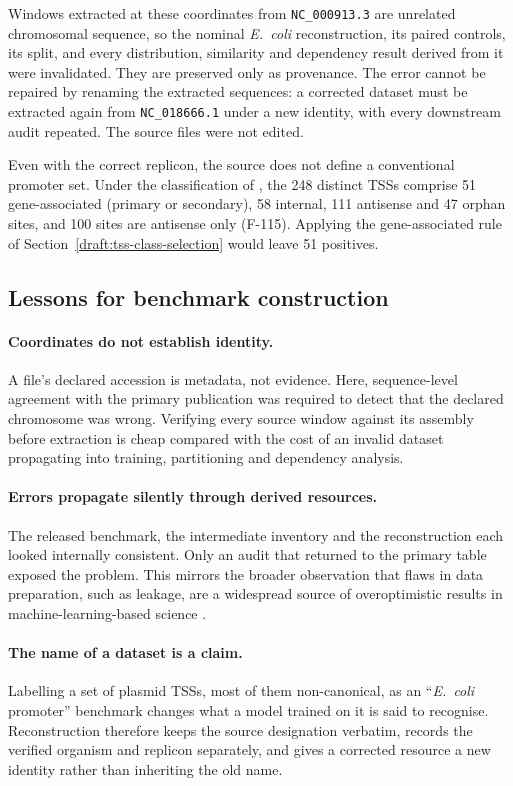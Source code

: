 Windows extracted at these coordinates from \texttt{NC\_000913.3} are unrelated
chromosomal sequence, so the nominal \textit{E.~coli} reconstruction, its paired
controls, its split, and every distribution, similarity and dependency result
derived from it were invalidated. They are preserved only as provenance. The
error cannot be repaired by renaming the extracted sequences: a corrected
dataset must be extracted again from \texttt{NC\_018666.1} under a new identity,
with every downstream audit repeated. The source files were not edited.

Even with the correct replicon, the source does not define a conventional
promoter set. Under the classification of \citet{sharma2010primary}, the
248 distinct TSSs comprise 51 gene-associated (primary or secondary), 58
internal, 111 antisense and 47 orphan sites, and 100 sites are antisense only
(F-115). Applying the gene-associated rule of Section~\ref{draft:tss-class-selection}
would leave 51 positives.

\subsection{Lessons for benchmark construction}

\paragraph{Coordinates do not establish identity.}
A file's declared accession is metadata, not evidence. Here, sequence-level
agreement with the primary publication was required to detect that the
declared chromosome was wrong. Verifying every source window against its
assembly before extraction is cheap compared with the cost of an invalid
dataset propagating into training, partitioning and dependency analysis.

\paragraph{Errors propagate silently through derived resources.}
The released benchmark, the intermediate inventory and the reconstruction each
looked internally consistent. Only an audit that returned to the primary table
exposed the problem. This mirrors the broader observation that flaws in data
preparation, such as leakage, are a widespread source of overoptimistic results
in machine-learning-based science \citep{kapoor2023leakage}.

\paragraph{The name of a dataset is a claim.}
Labelling a set of plasmid TSSs, most of them non-canonical, as an
``\textit{E.~coli} promoter'' benchmark changes what a model trained on it is
said to recognise. Reconstruction therefore keeps the source designation
verbatim, records the verified organism and replicon separately, and gives a
corrected resource a new identity rather than inheriting the old name.

